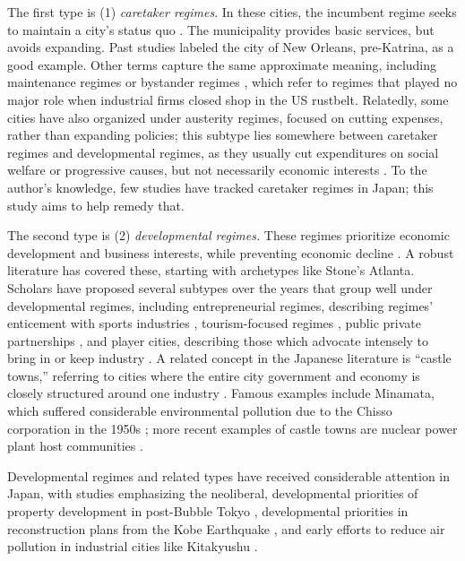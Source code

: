 \documentclass[preprint, 3p,
authoryear]{elsarticle} %
\begin{document}
The first type is (1) \emph{caretaker regimes}. In these cities, the
incumbent regime seeks to maintain a city's status quo
\citep{turner_1992, whelan_et_al_1994}. The municipality provides basic
services, but avoids expanding. Past studies labeled the city of New
Orleans, pre-Katrina, as a good example. Other terms capture the same
approximate meaning, including maintenance regimes \citep{stone_1989} or
bystander regimes \citep{portz_1990}, which refer to regimes that played
no major role when industrial firms closed shop in the US rustbelt.
Relatedly, some cities have also organized under austerity regimes,
focused on cutting expenses, rather than expanding policies; this
subtype lies somewhere between caretaker regimes and developmental
regimes, as they usually cut expenditures on social welfare or
progressive causes, but not necessarily economic interests
\citep{davies_and_blanco_2017}. To the author's knowledge, few studies
have tracked caretaker regimes in Japan; this study aims to help remedy
that.

The second type is (2) \emph{developmental regimes.} These regimes
prioritize economic development and business interests, while preventing
economic decline
\citep{stone_1989, austrian_and_rosentraub_2002, de_socio_2007}. A
robust literature has covered these, starting with archetypes like
Stone's \citeyearpar{stone_1989} Atlanta. Scholars have proposed several
subtypes over the years that group well under developmental regimes,
including entrepreneurial regimes, describing regimes' enticement with
sports industries \citep{euchner_1993}, tourism-focused regimes
\citep{russo_and_scarnato_2018}, public private partnerships
\citep{davies_2017}, and player cities, describing those which advocate
intensely to bring in or keep industry \citep{portz_1990}. A related
concept in the Japanese literature is ``castle towns,'' referring to
cities where the entire city government and economy is closely
structured around one industry \citep{hill_and_fujita_1993}. Famous
examples include Minamata, which suffered considerable environmental
pollution due to the Chisso corporation in the 1950s
\citep{funabashi_2006}; more recent examples of castle towns are nuclear
power plant host communities \citep{aldrich_and_fraser_2017}.

Developmental regimes and related types have received considerable
attention in Japan, with studies emphasizing the neoliberal,
developmental priorities of property development in post-Bubble Tokyo
\citep{saito_2003, tsukamoto_2012, sorensen_et_al_2010}, developmental
priorities in reconstruction plans from the Kobe Earthquake
\citep{edgington_2010}, and early efforts to reduce air pollution in
industrial cities like Kitakyushu \citep{yeum_2002}.
\end{document}
